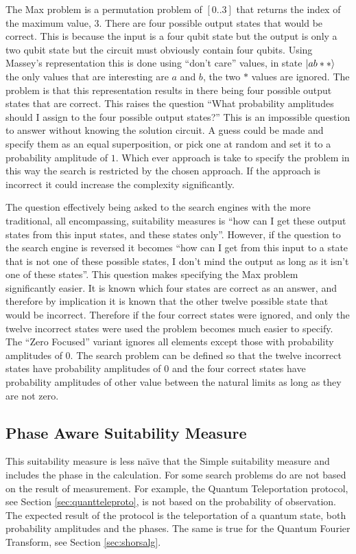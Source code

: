 The Max problem is a permutation problem of $[0..3]$ that returns the index of the maximum value, $3$.
There are four possible output states that would be correct.
This is because the input is a four qubit state but the output is only a two qubit state but the circuit must obviously contain four qubits.
Using Massey's\cite{masseythesis} representation this is done using ``don't care'' values, in state $\left\vert{ab**}\right\rangle$ the only values that are interesting are $a$ and $b$, the two $*$ values are ignored.
The problem is that this representation results in there being four possible output states that are correct.
This raises the question ``What probability amplitudes should I assign to the four possible output states?''
This is an impossible question to answer without knowing the solution circuit.
A guess could be made and specify them as an equal superposition, or pick one at random and set it to a probability amplitude of $1$.
Which ever approach is take to specify the problem in this way the search is restricted by the chosen approach.
If the approach is incorrect it could increase the complexity significantly.

The question effectively being asked to the search engines with the more traditional, all encompassing, suitability measures is ``how can I get these output states from this input states, and these states only''.
However, if the question to the search engine is reversed it becomes ``how can I get from this input to a state that is not one of these possible states, I don't mind the output as long as it isn't one of these states''.
This question makes specifying the Max problem significantly easier.
It is known which four states are correct as an answer, and therefore by implication it is known that the other twelve possible state that would be incorrect.
Therefore if the four correct states were ignored, and only the twelve incorrect states were used the problem becomes much easier to specify.
The ``Zero Focused'' variant ignores all elements except those with probability amplitudes of $0$.
The search problem can be defined so that the twelve incorrect states have probability amplitudes of $0$ and the four correct states have probability amplitudes of other value between the natural limits as long as they are not zero.


\subsection{Phase Aware Suitability Measure}
\label{sec:phaseawaresuitmeas}
This suitability measure is less na\"{\i}ve that the Simple suitability measure and includes the phase in the calculation.
For some search problems do are not based on the result of measurement.
For example, the Quantum Teleportation protocol, see Section \ref{sec:quantteleproto}, is not based on the probability of observation.
The expected result of the protocol is the teleportation of a quantum state, both probability amplitudes and the phases.
The same is true for the Quantum Fourier Transform, see Section \ref{sec:shorsalg}.

